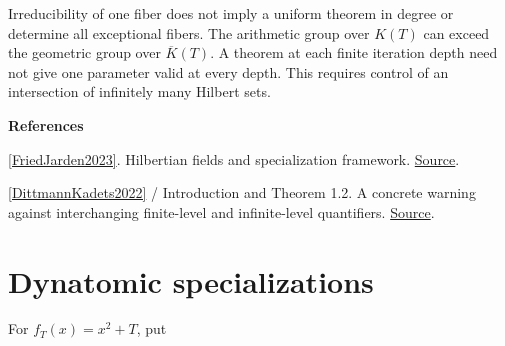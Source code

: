 \documentclass[11pt,a4paper,oneside,openany]{book}
\newenvironment{sources}{\par\smallskip\begingroup\footnotesize\color{atlasgray}\leftskip=10pt\setlength{\parskip}{2pt}}{\par\endgroup\smallskip}
\begin{document}
\begin{atlasblock}[boundary]
\color{black} Irreducibility of one fiber does not imply a uniform theorem in degree or determine all exceptional fibers. The arithmetic group over \(K(T)\) can exceed the geometric group over \(\overline K(T)\). A theorem at each finite iteration depth need not give one parameter valid at every depth. This requires control of an intersection of infinitely many Hilbert sets.\par
\end{atlasblock}\color{black}
\begin{sources}
\textbf{References}\par\smallskip
\noindent\hyperlink{ref:FriedJarden2023}{[FriedJarden2023]}. Hilbertian fields and specialization framework. \href{https://link.springer.com/book/10.1007/978-3-031-28020-7}{Source}.\par
\noindent\hyperlink{ref:DittmannKadets2022}{[DittmannKadets2022]} / Introduction and Theorem 1.2. A concrete warning against interchanging finite-level and infinite-level quantifiers. \href{https://arxiv.org/abs/2012.03076}{Source}.\par
\end{sources}\color{black}
\section{Dynatomic specializations}
\color{black} For \(f_T(x)=x^2+T\), put\par
\end{document}
